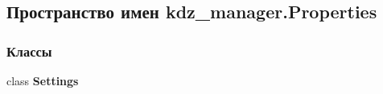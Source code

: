 \subsection{Пространство имен kdz\+\_\+manager.\+Properties}
\label{namespacekdz__manager_1_1_properties}
\subsubsection*{Классы}
\begin{DoxyCompactItemize}
\item 
class {\bfseries Settings}
\end{DoxyCompactItemize}
